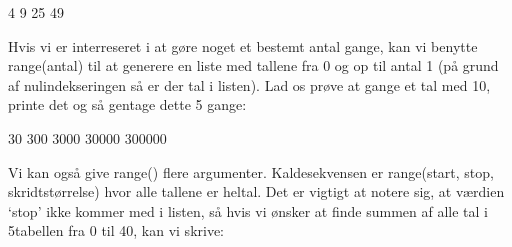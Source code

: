 \documentclass[letterpaper,10pt,english]{jupyterBook}
\begin{document}
\begin{sphinxVerbatim}[commandchars=\\\{\}]
  \PYG{p}{[}   \PYG{p}{]}

        
       
\end{sphinxVerbatim}

\begin{sphinxVerbatim}[commandchars=\\\{\}]
4
9
25
49
\end{sphinxVerbatim}

Hvis vi er interreseret i at gøre noget et bestemt antal gange, kan vi benytte range(antal) til at generere en liste med tallene fra 0 og op til antal \sphinxhyphen{} 1 (på grund af nulindekseringen så er der  tal i listen). Lad os prøve at gange et tal med 10, printe det og så gentage dette 5 gange:

\begin{sphinxVerbatim}[commandchars=\\\{\}]
  
    
       
\end{sphinxVerbatim}

\begin{sphinxVerbatim}[commandchars=\\\{\}]
30
300
3000
30000
300000
\end{sphinxVerbatim}

Vi kan også give range() flere argumenter. Kaldesekvensen er range(start, stop, skridtstørrelse) hvor alle tallene er heltal. Det er vigtigt at notere sig, at værdien ‘stop’ ikke kommer med i listen, så hvis vi ønsker at finde summen af alle tal i 5\sphinxhyphen{}tabellen fra 0 til 40, kan vi skrive:
\end{document}
